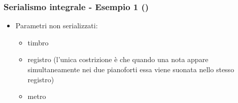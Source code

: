 \begin{frame}
    \frametitle{Serialismo integrale - Esempio 1 ()}

    \begin{itemize}

        \item Parametri non serializzati:

        \begin{itemize}

            \item timbro

            \item registro (l'unica costrizione \`e che quando una nota
                appare simultaneamente nei due pianoforti
                essa viene suonata nello stesso registro)

            \item metro

        \end{itemize}

    \end{itemize}

\end{frame}
